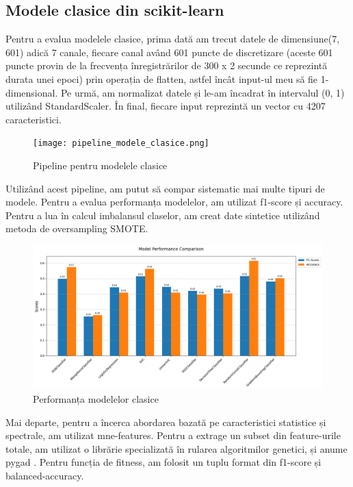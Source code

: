 \subsection{Modele clasice din scikit-learn}
Pentru a evalua modelele clasice, prima dată am trecut datele de dimensiune(7, 601) adică 7 canale, fiecare canal având 601 puncte de discretizare (aceste 601 puncte provin de la frecvența înregistrărilor de 300 x 2 secunde ce reprezintă durata unei epoci) prin operația de flatten, astfel încât input-ul meu să fie 1-dimensional. Pe urmă, am normalizat datele și le-am încadrat în intervalul (0, 1) utilizând StandardScaler. În final, fiecare input reprezintă un vector cu 4207 caracteristici.

\setlength{\abovecaptionskip}{0pt}
\setlength{\belowcaptionskip}{0pt}
\clearpage
\begin{figure}[h]
    \centering
    \texttt{[image: pipeline\_modele\_clasice.png]}
    \caption{Pipeline pentru modelele clasice}
    \label{fig:enter-label}
\end{figure}

Utilizând acest pipeline, am putut să compar sistematic mai multe tipuri de modele. Pentru a evalua performanța modelelor, am utilizat f1-score și accuracy. Pentru a lua în calcul imbalansul claselor, am creat date sintetice utilizând metoda de oversampling SMOTE. %

\vspace{1em}
\begin{figure}[h]
    \centering
    \includegraphics[width=1\textwidth]{images/comparatie_modele_clasice_unweighted.png}
    \caption{Performanța modelelor clasice}
    \label{fig:enter-label}
\end{figure}

Mai departe, pentru a încerca abordarea bazată pe caracteristici statistice și spectrale, am utilizat mne-features. Pentru a extrage un subset din feature-urile totale, am utilizat o librărie specializată în rularea algoritmilor genetici, și anume pygad \cite{pygad}. Pentru funcția de fitness, am folosit un tuplu format din f1-score și balanced-accuracy.

